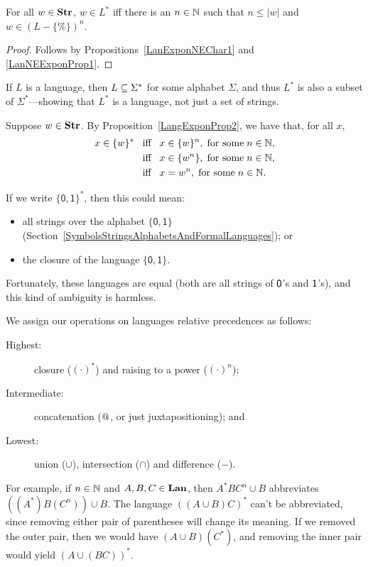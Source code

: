 \begin{proposition}
\label{LanExponNEChar2}
For all $w\in\mathbf{Str}$, $w\in L^*$ iff there is an $n\in\mathbb{N}$ such that
$n\leq |w|$ and $w\in (L-\{\%\})^n$.
\end{proposition}

\begin{proof}
Follows by Propositions~\ref{LanExponNEChar1} and \ref{LanNEExponProp1}.
\end{proof}

If $L$ is a language, then $L\subseteq\Sigma^*$ for some alphabet $\Sigma$,
and thus $L^*$ is also a subset of $\Sigma^*$---showing that $L^*$
is a language, not just a set of strings.

Suppose $w\in\mathbf{Str}$.
By Proposition~\ref{LangExponProp2}, we have
that, for all $x$,
\begin{align*}
x\in\{w\}^* &\mathrel{\;\;\allowbreak\mbox{iff}\allowbreak\;\;} x\in\{w\}^n,\;\allowbreak\mbox{for some}\allowbreak\;n\in\mathbb{N} , \\
&\mathrel{\;\;\allowbreak\mbox{iff}\allowbreak\;\;} x\in\{w^n\},\;\allowbreak\mbox{for some}\allowbreak\;n\in\mathbb{N} , \\
&\mathrel{\;\;\allowbreak\mbox{iff}\allowbreak\;\;} x=w^n, \;\allowbreak\mbox{for some}\allowbreak\; n\in\mathbb{N} .
\end{align*}

If we write $\mathsf{\{0,1\}}^*$, then this could mean:
\begin{itemize}
\item
all strings over the alphabet $\mathsf{\{0,1\}}$
(Section~\ref{SymbolsStringsAlphabetsAndFormalLanguages}); or

\item
the closure of the language $\mathsf{\{0,1\}}$.
\end{itemize}
Fortunately, these languages are equal (both are all strings of
$\mathsf{0}$'s and $\mathsf{1}$'s), and this kind of ambiguity is harmless.

%
We assign our operations on languages relative precedences as follows:
\begin{description}
\item[\quad Highest:] closure ($(\cdot)^*$) and raising to a power
($(\cdot)^n$);

\item[\quad Intermediate:] concatenation ($\mathbin{@}$, or just
  juxtapositioning); and

\item[\quad Lowest:] union ($\cup$), intersection ($\cap$) and difference ($-$).
\end{description}
For example, if $n\in\mathbb{N}$ and $A,B,C\in\mathbf{Lan}$, then $A^*BC^n\cup B$
abbreviates $((A^*)B(C^n))\cup B$.  The language $((A\cup B)C)^*$
can't be abbreviated, since removing either pair of parentheses will
change its meaning.  If we removed the outer pair, then we would have
$(A\cup B)(C^*)$, and removing the inner pair would yield $(A\cup
(BC))^*$.

